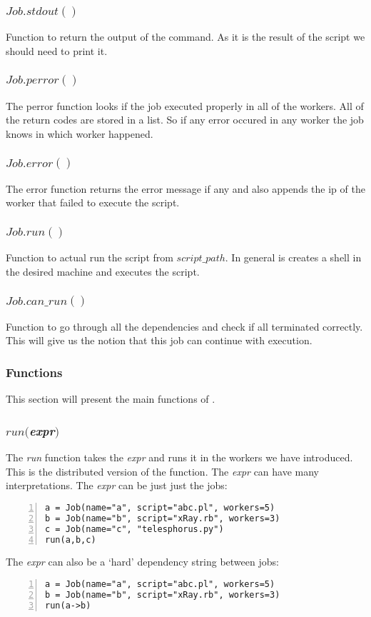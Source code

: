 \subsubsection*{$Job.stdout()$}
Function to return the output of the command. As it is the result of the script we should need to print it.
\subsubsection*{$Job.perror()$}
The perror function looks if the job executed properly in all of the workers. All of the return codes are stored in a list. So if any error occured in any worker the job knows in which worker happened.
\subsubsection*{$Job.error()$}
The error function returns the error message if any and also appends the ip of the worker that failed to execute the script.
\subsubsection*{$Job.run()$}
Function to actual run the script from $script\_path$. In general is creates a shell in the desired machine
and executes the script.
\subsubsection*{$Job.can\_run()$}
Function to go through all the dependencies and check if all terminated correctly. This will give us the notion
that this job can continue with execution.

\subsubsection*{Functions}

This section will present the main functions of \lang{}.
\subsubsection*{$run($\textit{expr}$)$}
The \textit{run} function takes the \textit{expr} and runs it in the workers we have introduced.
This is the distributed version of the function.
The \textit{expr} can have many interpretations. The \textit{expr} can be just just the jobs:
\begin{Verbatim}[numbers=left]
a = Job(name="a", script="abc.pl", workers=5)
b = Job(name="b", script="xRay.rb", workers=3)
c = Job(name="c", "telesphorus.py")
run(a,b,c)
\end{Verbatim}
The \textit{expr} can also be a `hard' dependency string between jobs:
\begin{Verbatim}[numbers=left]
a = Job(name="a", script="abc.pl", workers=5)
b = Job(name="b", script="xRay.rb", workers=3)
run(a->b)
\end{Verbatim}
